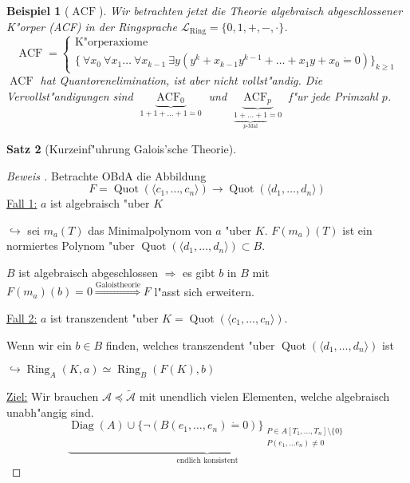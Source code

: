 \documentclass[a4paper,12pt,numbers=noenddot,parskip=full]{scrartcl}
\newcommand{\Forall}{~\forall}
\newcommand{\Exists}{~\exists}
\newcommand{\scrL}{\mathcal{L}}
\newcommand{\scrA}{\mathcal{A}}
\DeclareMathOperator{\Diag}{Diag}
\newcommand{\vdig}{\Diag}
\DeclareMathOperator{\acf}{ACF}
\DeclareMathOperator{\quo}{Quot}
\DeclareMathOperator{\ring}{Ring}
\theoremstyle{dotless}
\newtheorem{theorem}{Satz}[section]
\newtheorem{example}[theorem]{Beispiel}
\begin{document}
\begin{example}[$\acf$]\label{acf:ex}
	Wir betrachten jetzt die Theorie algebraisch abgeschlossener K"orper (ACF) in der Ringsprache $\scrL_\text{Ring}=\{0, 1, +, -, \cdot \}$.
	\begin{equation*}
		\acf = \begin{cases}
		\text{K"orperaxiome}\\
		\{\Forall x_0 \Forall x_1 \dots \Forall x_{k-1} \Exists y (y^k + x_{k-1} y^{k-1} + \dots + x_1 y + x_0 \dot= 0) \}_{k \geq 1}
		\end{cases}
	\end{equation*}
	$\acf$ hat Quantorenelimination, ist aber nicht vollst"andig. Die Vervollst"andigungen sind $\underbrace{\acf_0}_{1+1+ \dots + 1 \dot= 0}$ und $\underbrace{\acf_p}_{\underbrace{1+\dots+1}_{p\text{-Mal}} \dot= 0}$ f"ur jede Primzahl $p$.
\end{example}

\begin{theorem}[Kurzeinf"uhrung Galois'sche Theorie]
\end{theorem}

\begin{proof}[Beweis ]
	Betrachte OBdA die Abbildung
	\begin{equation*}
		F = \quo (\langle c_1, \dots, c_n \rangle) \longrightarrow \quo (\langle d_1, \dots, d_n \rangle)
	\end{equation*}
	\underline{Fall 1:} $a$ ist algebraisch "uber $K$
	
	$\hookrightarrow$ sei $m_a(T)$ das Minimalpolynom von $a$ "uber $K$. $F(m_a)(T)$ ist ein normiertes Polynom "uber $\quo(\langle d_1, \dots, d_n \rangle) \subset B$.
	
	$B$ ist algebraisch abgeschlossen $\Rightarrow$ es gibt $b$ in $B$ mit $F(m_a)(b)=0 \overset{\text{Galoistheorie}}{\Longrightarrow} F$ l"asst sich erweitern. 
	
	\underline{Fall 2:} $a$ ist transzendent "uber $K = \quo (\langle c_1, \dots, c_n \rangle)$.
	
	Wenn wir ein $b \in B$ finden, welches transzendent "uber $\quo(\langle d_1, \dots, d_n \rangle)$ ist
	
	$\hookrightarrow \ring_A (K, a) \simeq \ring_B (F(K), b)$
	
	\underline{Ziel:} Wir brauchen $\scrA \preceq \tilde{\scrA}$ mit unendlich vielen Elementen, welche algebraisch unabh"angig sind.
	\begin{equation*}
		\underbrace{\vdig(A) \cup \{\lnot (B(e_1, \dots, e_n)\dot= 0) \}_{\substack{P \in A[T_1, \dots, T_n] \setminus \{0\}\\P(e_1, \dots e_n) \neq 0}}}_{\text{endlich konsistent}}
	\end{equation*}
\end{proof}
\end{document}
